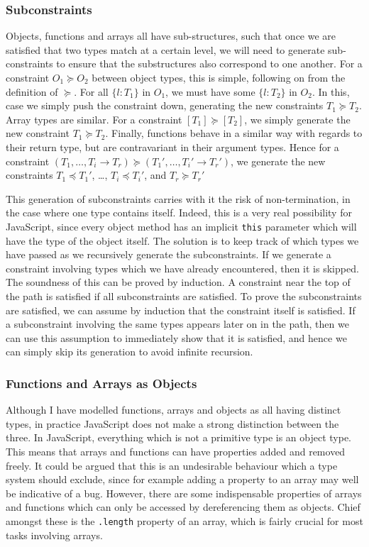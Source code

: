\documentclass[12pt,a4paper,twoside,openright]{report}
\theoremstyle{definition}
\theoremstyle{dotless}
\newcommand*{\js}{\texttt}
\begin{document}
\subsubsection*{Subconstraints}
Objects, functions and arrays all have sub-structures, such that once we are
satisfied that two types match at a certain level, we will need to generate
sub-constraints to ensure that the substructures also correspond to one
another. For a constraint $O_1\succeq O_2$ between object types, this is
simple, following on from the definition of $\succeq$. For all $\{l:T_1\}$ in
$O_1$, we must have some $\{l:T_2\}$ in $O_2$. In this, case we simply push the
constraint down, generating the new constraints $T_1\succeq T_2$. Array types
are similar.  For a constraint $[T_1]\succeq[T_2]$, we simply generate the new
constraint $T_1\succeq T_2$. Finally, functions behave in a similar way with
regards to their return type, but are contravariant in their argument types.
Hence for a constraint $(T_1, \ldots, T_i \rightarrow T_r) \succeq(T_1',
\ldots, T_i' \rightarrow T_r')$, we generate the new constraints $T_1\preceq
T_1'$, \dots, $T_i\preceq T_i'$, and $T_r \succeq T_r'$

This generation of subconstraints carries with it the risk of non-termination,
in the case where one type contains itself. Indeed, this is a very real
possibility for JavaScript, since every object method has an implicit \js{this}
parameter which will have the type of the object itself. The solution is to
keep track of which types we have passed as we recursively generate the
subconstraints. If we generate a constraint involving types which we have
already encountered, then it is skipped. The soundness of this can be proved by
induction. A constraint near the top of the path is satisfied if all
subconstraints are satisfied. To prove the subconstraints are satisfied, we can
assume by induction that the constraint itself is satisfied. If a subconstraint
involving the same types appears later on in the path, then we can use this
assumption to immediately show that it is satisfied, and hence we can simply
skip its generation to avoid infinite recursion.

\subsubsection*{Functions and Arrays as Objects}

Although I have modelled functions, arrays and objects as all having distinct
types, in practice JavaScript does not make a strong distinction between the
three. In JavaScript, everything which is not a primitive type is an object
type. This means that arrays and functions can have properties added and
removed freely. It could be argued that this is an undesirable behaviour which
a type system should exclude, since for example adding a property to an array
may well be indicative of a bug. However, there are some indispensable
properties of arrays and functions which can only be accessed by dereferencing
them as objects. Chief amongst these is the \js{.length} property of an array,
which is fairly crucial for most tasks involving arrays.
\end{document}
